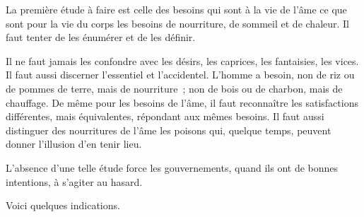 \documentclass[french,twoside]{book} %
\begin{document}
La première étude à faire est celle des besoins qui sont à la vie de l'âme ce que sont pour la vie du corps les besoins de nourriture, de sommeil et de chaleur. Il faut tenter de les énumérer et de les définir.\par
Il ne faut jamais les confondre avec les désirs, les caprices, les fantaisies, les vices. Il faut aussi discerner l'essentiel et l'accidentel. L'homme a besoin, non de riz ou de pommes de terre, mais de nourriture ; non de bois ou de charbon, mais de chauffage. De même pour les besoins de l'âme, il faut reconnaître les satisfactions différentes, mais équivalentes, répondant aux mêmes besoins. Il faut aussi distinguer des nourritures de l'âme les poisons qui, quelque temps, peuvent donner l'illusion d'en tenir lieu.\par
L'absence d'une telle étude force les gouvernements, quand ils ont de bonnes intentions, à s'agiter au hasard.\par
Voici quelques indications.\par
\textbf{}\par
\end{document}
